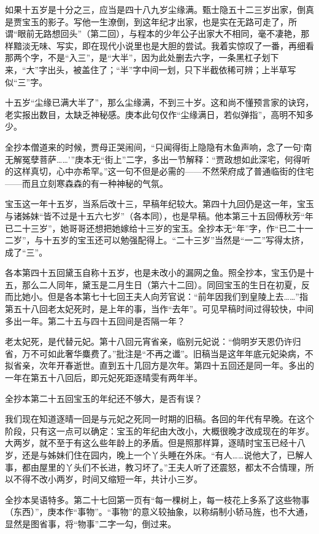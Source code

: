 \par 如果十五岁是十分之三，应当是四十八九岁尘缘满。甄士隐五十二三岁出家，倒真是贾宝玉的影子。写他一生潦倒，到这年纪才出家，也是实在无路可走了，所谓“眼前无路想回头”（第二回），与程本的少年公子出家大不相同，毫不凄艳，那样黯淡无味、写实，即在现代小说里也是大胆的尝试。我着实惊叹了一番，再细看那两个字，不是“入三”，是“大半”，因为此处删去六字，一条黑杠子划下来，“大”字出头，被盖住了；“半”字中间一划，只下半截依稀可辨；上半草写似“三”字。
\par 十五岁“尘缘已满大半了”，那么尘缘满，不到三十岁。这和尚不懂预言家的诀窍，老实报出数目，太缺乏神秘感。庚本此句仅作“尘缘满日，若似弹指”，高明不知多少。
\par 全抄本僧道来的时候，贾母正哭闹间，“只闻得街上隐隐有木鱼声响，念了一句‘南无解冤孽菩萨……'”庚本无“街上”二字，多出一节解释：“贾政想如此深宅，何得听的这样真切，心中亦希罕。”这一句不但是必需的——不然荣府成了普通临街的住宅——而且立刻寒森森的有一种神秘的气氛。
\par 宝玉这一年十五岁，当系后改十三，早稿年纪较大。第四十九回仍是这一年，宝玉与诸姊妹“皆不过是十五六七岁”（各本同），也是早稿。他本第三十五回傅秋芳“年已二十三岁”，她哥哥还想把她嫁给十三岁的宝玉。全抄本无“年”字，作“已二十一二岁”，与十五岁的宝玉还可以勉强配得上。“二十三岁”当然是“一二”写得太挤，成了“三”。
\par 各本第四十五回黛玉自称十五岁，也是未改小的漏网之鱼。照全抄本，宝玉仍是十五，那么二人同年，黛玉是二月生日（第六十二回）。同回宝玉的生日在初夏，反而比她小。但是各本第七十七回王夫人向芳官说：“前年因我们到皇陵上去……”指第五十八回老太妃死时，是上年的事，当作“去年”。可见早稿时间过得较快，中间多出一年。第二十五与四十五回间是否隔一年？
\par 老太妃死，是代替元妃。第十八回元宵省亲，临别元妃说：“倘明岁天恩仍许归省，万不可如此奢华麋费了。”批注是“不再之谶”。旧稿当是这年年底元妃染病，不拟省亲，次年开春逝世。直到五十几回方是次年。第四十五回还是同一年。多出的一年在第五十八回后，即元妃死距逐晴雯有两年半。
\par 全抄本第二十五回宝玉的年纪还不够大，是否有误？
\par 我们现在知道逐晴一回是与元妃之死同一时期的旧稿。各回的年代有早晚。在这个阶段，只有这一点可以确定：宝玉的年纪由大改小，大概很晚才改成现在的年岁。大两岁，就不至于有这么些年龄上的矛盾。但是照那样算，逐晴时宝玉已经十八岁，还是与姊妹们住在园内，晚上一个丫头睡在外床。“有人……说他大了，已解人事，都由屋里的丫头们不长进，教习坏了。”王夫人听了还震怒，都太不合情理，所以不得不改小两岁，时间又缩短一年，共计小三岁。
\par 全抄本吴语特多。第二十七回第一页有“每一棵树上，每一枝花上多系了这些物事（东西）”，庚本作“事物”。“事物”的意义较抽象，以称绢制小轿马旌，也不大通，显然是图省事，将“物事”二字一勾，倒过来。
